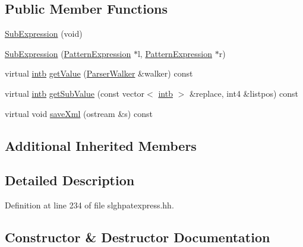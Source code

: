 \subsection*{Public Member Functions}
\begin{DoxyCompactItemize}
\item 
\mbox{\hyperlink{class_sub_expression_aaf3ca14ecff2053db54b8f3024593d5d}{Sub\+Expression}} (void)
\item 
\mbox{\hyperlink{class_sub_expression_a7d06a9320ed2c3a70277f71763852c0d}{Sub\+Expression}} (\mbox{\hyperlink{class_pattern_expression}{Pattern\+Expression}} $\ast$l, \mbox{\hyperlink{class_pattern_expression}{Pattern\+Expression}} $\ast$r)
\item 
virtual \mbox{\hyperlink{types_8h_aa925ba3e627c2df89d5b1cfe84fb8572}{intb}} \mbox{\hyperlink{class_sub_expression_a1c565bff8bbdc848b03c49818d13b4a6}{get\+Value}} (\mbox{\hyperlink{class_parser_walker}{Parser\+Walker}} \&walker) const
\item 
virtual \mbox{\hyperlink{types_8h_aa925ba3e627c2df89d5b1cfe84fb8572}{intb}} \mbox{\hyperlink{class_sub_expression_a56c441953eedc3a8f55d3b716b7ed7f5}{get\+Sub\+Value}} (const vector$<$ \mbox{\hyperlink{types_8h_aa925ba3e627c2df89d5b1cfe84fb8572}{intb}} $>$ \&replace, int4 \&listpos) const
\item 
virtual void \mbox{\hyperlink{class_sub_expression_ad928f4c50f72f0c16872aad6071a4387}{save\+Xml}} (ostream \&s) const
\end{DoxyCompactItemize}
\subsection*{Additional Inherited Members}


\subsection{Detailed Description}


Definition at line 234 of file slghpatexpress.\+hh.



\subsection{Constructor \& Destructor Documentation}
\mbox{\label{class_sub_expression_aaf3ca14ecff2053db54b8f3024593d5d}} 
